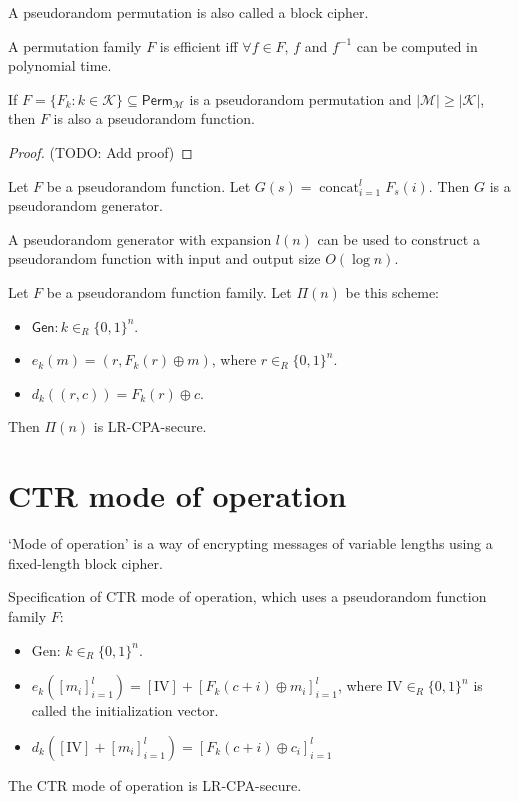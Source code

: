 A pseudorandom permutation is also called a block cipher.

\begin{definition} A permutation family $F$ is efficient iff $\forall f \in F$,
$f$ and $f^{-1}$ can be computed in polynomial time. \end{definition}

\begin{theorem}
If $F = \{F_k: k \in \mathcal{K}\} \subseteq \mathsf{Perm}_{\mathcal{M}}$
is a pseudorandom permutation and $|\mathcal{M}| \ge |\mathcal{K}|$,
then $F$ is also a pseudorandom function.
\end{theorem}
\begin{proof} (TODO: Add proof) \end{proof}

\begin{theorem}
Let $F$ be a pseudorandom function. Let $G(s) = \operatorname{concat}_{i=1}^l F_s(i)$.
Then $G$ is a pseudorandom generator.
\end{theorem}

\begin{theorem}
A pseudorandom generator with expansion $l(n)$ can be used to construct a pseudorandom function
with input and output size $O(\log n)$.
\end{theorem}

\begin{theorem}
Let $F$ be a pseudorandom function family. Let $\Pi(n)$ be this scheme:
\begin{itemize}
\item $\mathsf{Gen}: k \in_R \{0, 1\}^n$.
\item $e_k(m) = (r, F_k(r) \oplus m)$, where $r \in_R \{0, 1\}^n$.
\item $d_k((r, c)) = F_k(r) \oplus c$.
\end{itemize}
Then $\Pi(n)$ is LR-CPA-secure.
\end{theorem}

\section{CTR mode of operation}

`Mode of operation' is a way of encrypting messages of variable lengths
using a fixed-length block cipher.

Specification of CTR mode of operation, which uses a pseudorandom function family $F$:
\begin{itemize}
\item \textsf{Gen}: $k \in_R \{0, 1\}^n$.
\item $e_k([m_i]_{i=1}^l) = [\mathrm{IV}] + [F_k(c+i) \oplus m_i]_{i=1}^l$,
where $\mathrm{IV} \in_R \{0, 1\}^n$ is called the initialization vector.
\item $d_k([\mathrm{IV}] + [m_i]_{i=1}^l) = [F_k(c+i) \oplus c_i]_{i=1}^l$
\end{itemize}

\begin{theorem} The CTR mode of operation is LR-CPA-secure. \end{theorem}


